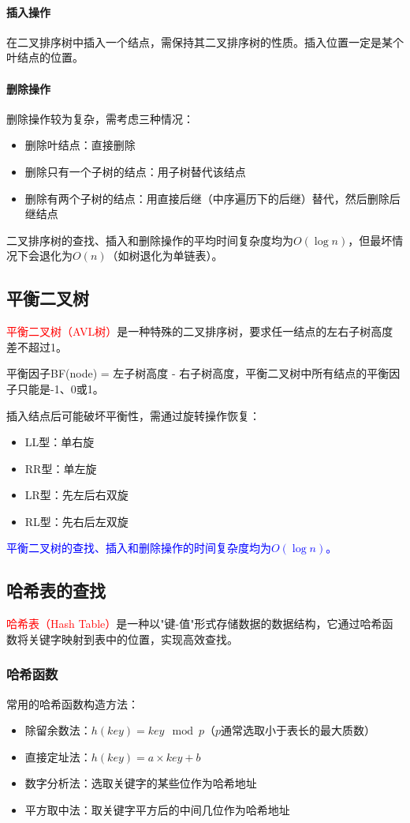\documentclass{../../note}
\begin{document}
\paragraph{插入操作}
在二叉排序树中插入一个结点，需保持其二叉排序树的性质。插入位置一定是某个叶结点的位置。

\paragraph{删除操作}
删除操作较为复杂，需考虑三种情况：
\begin{itemize}
  \item 删除叶结点：直接删除
  \item 删除只有一个子树的结点：用子树替代该结点
  \item 删除有两个子树的结点：用直接后继（中序遍历下的后继）替代，然后删除后继结点
\end{itemize}

二叉排序树的查找、插入和删除操作的平均时间复杂度均为$O(\log n)$，但最坏情况下会退化为$O(n)$（如树退化为单链表）。

\subsection{平衡二叉树}
\textcolor{red}{平衡二叉树（AVL树）}是一种特殊的二叉排序树，要求任一结点的左右子树高度差不超过1。

平衡因子BF(node) = 左子树高度 - 右子树高度，平衡二叉树中所有结点的平衡因子只能是-1、0或1。

插入结点后可能破坏平衡性，需通过旋转操作恢复：
\begin{itemize}
  \item LL型：单右旋
  \item RR型：单左旋
  \item LR型：先左后右双旋
  \item RL型：先右后左双旋
\end{itemize}

\textcolor{blue}{平衡二叉树的查找、插入和删除操作的时间复杂度均为$O(\log n)$。}

\subsection{哈希表的查找}

\textcolor{red}{哈希表（Hash Table）}是一种以"键-值"形式存储数据的数据结构，它通过哈希函数将关键字映射到表中的位置，实现高效查找。

\subsubsection{哈希函数}
常用的哈希函数构造方法：
\begin{itemize}
  \item 除留余数法：$h(key) = key \mod p$（$p$通常选取小于表长的最大质数）
  \item 直接定址法：$h(key) = a \times key + b$
  \item 数字分析法：选取关键字的某些位作为哈希地址
  \item 平方取中法：取关键字平方后的中间几位作为哈希地址
\end{itemize}
\end{document}
